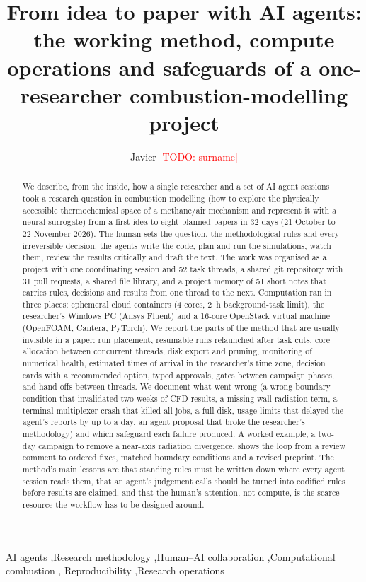 \documentclass[preprint,review,12pt]{elsarticle}
\newcommand{\todo}[1]{\textcolor{red}{[TODO: #1]}}
\begin{document}
\begin{frontmatter}

\title{From idea to paper with AI agents: the working method, compute operations and safeguards of a
one-researcher combustion-modelling project}

\author[a]{Javier \todo{surname}}
\address[a]{\todo{affiliation}}

\begin{abstract}
We describe, from the inside, how a single researcher and a set of AI agent sessions took a research question in
combustion modelling (how to explore the physically accessible thermochemical space of a methane/air mechanism and
represent it with a neural surrogate) from a first idea to eight planned papers in 32 days (21 October to 22 November
2026). The human sets the question, the methodological rules and every irreversible decision; the agents write the code,
plan and run the simulations, watch them, review the results critically and draft the text. The work was organised as a
project with one coordinating session and 52 task threads, a shared git repository with 31 pull requests, a shared file
library, and a project memory of 51 short notes that carries rules, decisions and results from one thread to the next.
Computation ran in three places: ephemeral cloud containers (4 cores, 2~h background-task limit), the researcher's
Windows PC (Ansys Fluent) and a 16-core OpenStack virtual machine (OpenFOAM, Cantera, PyTorch). We report the parts of
the method that are usually invisible in a paper: run placement, resumable runs relaunched after task cuts, core
allocation between concurrent threads, disk export and pruning, monitoring of numerical health, estimated times of
arrival in the researcher's time zone, decision cards with a recommended option, typed approvals, gates between
campaign phases, and hand-offs between threads. We document what went wrong (a wrong boundary condition that
invalidated two weeks of CFD results, a missing wall-radiation term, a terminal-multiplexer crash that killed all jobs,
a full disk, usage limits that delayed the agent's reports by up to a day, an agent proposal that broke the researcher's methodology)
and which safeguard each failure produced. A worked example, a two-day campaign to remove a near-axis radiation
divergence, shows the loop from a review comment to ordered fixes, matched boundary conditions and a revised preprint.
The method's main lessons are that standing rules must be written down where every agent session reads them, that
an agent's judgement calls should be turned into codified rules before results are claimed, and that the human's
attention, not compute, is the scarce resource the workflow has to be designed around.
\end{abstract}

\begin{keyword}
AI agents \sep Research methodology \sep Human--AI collaboration \sep Computational combustion \sep
Reproducibility \sep Research operations
\end{keyword}
\end{frontmatter}
\end{document}
